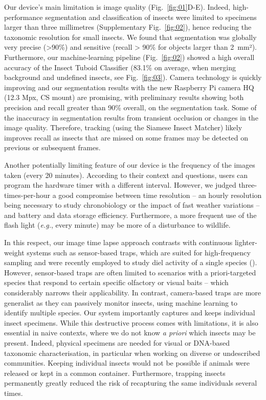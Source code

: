 \documentclass[12pt]{article}
\begin{document}
\begin{linenumbers}
		
		Our device’s main limitation is image quality (Fig.~\ref{fig:01}D-E). Indeed, high-performance segmentation and classification of insects were limited to specimens larger than three millimetres (Supplementary Fig.~\ref{fig:02}), hence reducing the taxonomic resolution for small insects. 
		We found that segmentation was globally very precise (>90\%) and sensitive (recall > 90\% for objects larger than 2~mm²). Furthermore, our machine-learning pipeline (Fig.~\ref{fig:02}) showed a high overall accuracy of the Insect Tuboid Classifier (83.1\% on average, when merging background and undefined insects, see Fig.~\ref{fig:03}). 
		Camera technology is quickly improving and our segmentation results with the new Raspberry Pi camera HQ (12.3 Mpx, CS mount) are promising, with preliminary results showing both precision and recall greater than 90\% overall, on the segmentation task.
		Some of the inaccuracy in segmentation results from transient occlusion or changes in the image quality. 
		Therefore, tracking (using the Siamese Insect Matcher) likely improves recall as insects that are missed on some frames may be detected on previous or subsequent frames.

		
		Another potentially limiting feature of our device is the frequency of the images taken (every 20 minutes). 
		According to their context and questions, users can program the hardware timer with a different interval.
		However, we judged three-times-per-hour a good compromise between time resolution -- an hourly resolution being necessary to study chronobiology or the impact of fast weather variations -- and battery and data storage efficiency.
		Furthermore, a more frequent use of the flash light (\emph{e.g.}, every minute) may be more of a disturbance to wildlife\cite{longcore_ecological_2004}.		

		In this respect, our image time lapse approach contrasts with continuous lighter-weight systems such as sensor-based traps, which are suited for high-frequency sampling and were recently employed to study diel activity of a single species (\cite{chen_flying_2014, goldshtein_long-term_2021}).
		However, sensor-based traps are often limited to scenarios with a priori-targeted species that respond to certain specific olfactory or visual baits – which considerably narrows their applicability\cite{preti_insect_2020}.
		In contrast, camera-based traps are more generalist as they can passively monitor insects, using machine learning to identify multiple species. Our system importantly captures and keeps individual insect specimens. 
		While this destructive process comes with limitations, 
		it is also essential in naive contexts, where we do not know \emph{a priori} which insects may be present.
		Indeed, physical specimens are needed for visual or DNA-based taxonomic characterisation, in particular when working on diverse or undescribed communities\cite{turney_non-repeatable_2015}.
		Keeping individual insects would not be possible if animals were released or kept in a common container. 
		Furthermore, trapping insects permanently greatly reduced the risk of recapturing the same individuals several times.


\end{linenumbers}
\end{document}
